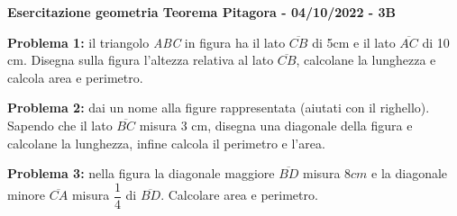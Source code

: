 \documentclass[14pt]{extarticle}
\begin{document}
\begin{center}
    \LARGE{\textbf{Esercitazione geometria Teorema Pitagora - 04/10/2022 - 3B}}
\end{center}
\vspace{1cm}

\textbf{Problema 1:} il triangolo \textit{ABC} in figura ha il lato \(\overline{CB}\) di 5cm e il lato \(\overline{AC}\) di 10 cm. Disegna sulla figura l'altezza relativa al lato \(\overline{CB}\), calcolane la lunghezza e calcola area e perimetro.

\vspace{0.5cm}

\vspace{0.5cm}
\textbf{Problema 2:} dai un nome alla figure rappresentata (aiutati con il righello). Sapendo che il lato \(\overline{BC}\) misura 3 cm, disegna una diagonale della figura e calcolane la lunghezza, infine calcola il perimetro e l'area.\\

\vspace{0.5cm}
\hspace{0.5cm}

\vspace{0.5cm}
\textbf{Problema 3:} nella figura la diagonale maggiore \(\overline{BD}\) misura \(8cm\) e la diagonale minore \(\overline{CA}\) misura \(\dfrac{1}{4}\) di \(\overline{BD}\). Calcolare area e perimetro.\\

\hspace{0.5cm}
\end{document}
